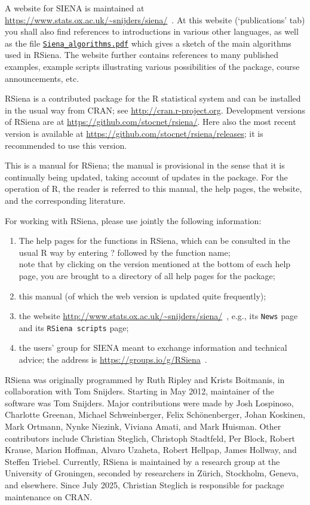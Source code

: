 \documentclass[a4paper,fleqn,11pt]{article}
\newcommand{\+}{\, + \,}
\newcommand{\sfn}[1]{\textsf{#1}}
\newcommand{\R}{{\sf R }}
\newcommand{\Rn}{{\sf R}}
\newcommand{\rs}{{\sf RSiena}}
\newcommand{\RS}{{\sf \textsf{RSiena} }}
\newcommand{\SI}{{\sf SIENA }}
\begin{document}
A website for \SI is maintained at
{\small\url{https://www.stats.ox.ac.uk/~snijders/siena/}~}.
At this website (`publications' tab)
you shall also find references to introductions in various other languages,
as well as the file
\href{https://www.stats.ox.ac.uk/~snijders/siena/Siena_algorithms.pdf}{\texttt{Siena\_algorithms.pdf}}
 which
gives a sketch of the main algorithms used in \rs.
The website further contains references to many published examples,
example scripts illustrating various possibilities of the package,
course announcements, etc.

\RS is a contributed package for the \R statistical system \citep{R}
and can be installed in the usual way from \sfn{CRAN};
see \url{http://cran.r-project.org}.
Development versions of \RS are at
\url{https://github.com/stocnet/rsiena/}.
Here also the most recent version is available
at \url{https://github.com/stocnet/rsiena/releases};
it is recommended to use this version.

This is a manual for \rs;
the manual is provisional in the sense
that it is continually being updated, taking account of
updates in the package. For the operation of \Rn,
the reader is referred to this manual, the help pages,
the website, and the corresponding literature.

For working with \rs, please use jointly the following
information:
\begin{enumerate}
  \item The help pages for the functions in \rs, which can be consulted
        in the usual \R way by entering ? followed by the function name;\\
        note that by clicking on the version mentioned at the bottom
        of each help page, you are brought to a directory of all help
        pages for the package;
  \item this manual (of which the web version is updated quite frequently);
  \item the website
{\small\url{http://www.stats.ox.ac.uk/~snijders/siena/}~},
        e.g., its \texttt{News} page and its \texttt{RSiena scripts} page;
  \item the users' group for \SI meant to exchange information
        and technical advice; the address is
        {\small\url{https://groups.io/g/RSiena}~}.
\end{enumerate}

\RS was originally programmed by Ruth Ripley and Krists Boitmanis,
in collaboration with Tom Snijders.
Starting in May 2012, maintainer of the software was Tom Snijders.
Major contributions were made by Josh Lospinoso, Charlotte Greenan,
Michael Schweinberger,
Felix Sch\"{o}nenberger, Johan Koskinen, Mark Ortmann, Nynke Niezink,
Viviana Amati, and Mark Huisman.
Other contributors include
Christian Steglich, Christoph Stadtfeld, Per Block,
Robert Krause, Marion Hoffman, Alvaro Uzaheta,
Robert Hellpap, James Hollway, and Steffen Triebel.
Currently, \RS is maintained by a research group
at the University of Groningen, seconded by researchers in Z\"{u}rich,
Stockholm, Geneva, and elsewhere.
Since July 2025, Christian Steglich is responsible for package
maintenance on CRAN.
\end{document}
